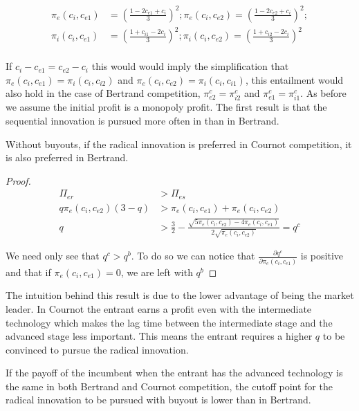 \begin{align*}
\pi_{e}(c_i,c_{e1}) &= \left(\frac{1-2 c_{e1}+c_{i}}{3}  \right)^2;
\pi_{e}(c_i,c_{e2}) = \left(\frac{1-2 c_{e2}+c_{i}}{3}  \right)^2; \\
\pi_{i}(c_i,c_{e1}) &= \left(\frac{1+ c_{i1}-2c_{i}}{3}  \right)^2;
\pi_{i}(c_i,c_{e2}) = \left(\frac{1+ c_{i2}-2c_{i}}{3}  \right)^2 \\
\end{align*}


If $c_i-c_{e1}=c_{e2}-c_i$ this would would imply the simplification that $\pi_{e}(c_i,c_{e1})=\pi_{i}(c_{i},c_{i2})$ and $\pi_{e}(c_i,c_{e2})=\pi_{i}(c_{i},c_{i1})$, this entailment would also hold in the case of Bertrand competition, $\pi_{e2}^{c}=\pi_{i2}^{c}$ and $\pi_{e1}^{c}=\pi_{i1}^{c}$. As before we assume the initial profit is a monopoly profit. The first result is that the sequential innovation is pursued more often in than in Bertrand.

\begin{proposition}
Without buyouts, if the radical innovation is preferred in Cournot competition, it is also preferred in Bertrand. 
\end{proposition}

\begin{proof}
\begin{align*}
\Pi_{er}&>\Pi_{es} \\
q \pi_{e}(c_i,c_{e2}) (3-q) &> \pi_{e}(c_i,c_{e1})+\pi_{e}(c_i,c_{e2}) \\
q&> 
 \frac{3}{2}-\frac{ \sqrt{5 \pi_{e}(c_i,c_{e2})-4 \pi_{e}(c_i,c_{e1})}}{2 \sqrt{\pi_{e}(c_i,c_{e2})}}=q^{c}
\end{align*}

We need only see that $q^{c}>q^{b}$. To do so we can notice that $\frac{\partial q^c}{\partial \pi_{e}(c_i,c_{e1}) }$ is positive and that if $\pi_{e}(c_i,c_{e1})=0$, we are left with $q^{b}$
\end{proof}

The intuition behind this result is due to the lower advantage of being the market leader. In Cournot the entrant earns a profit even with the intermediate technology which makes the lag time between the intermediate stage and the advanced stage less important. This means the entrant requires a higher $q$ to be convinced to pursue the radical innovation.  

\begin{proposition}
If the payoff of the incumbent when the entrant has the advanced technology is the same in both Bertrand and Cournot competition, the cutoff point for the radical innovation to be pursued with buyout is lower than in Bertrand. 
\end{proposition}

